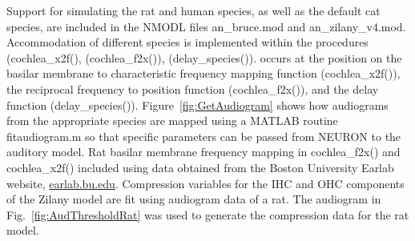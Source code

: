 Support for simulating the rat and human species, as well as the default cat
species, are included in the NMODL files \mbox{\textsf{an\_bruce.mod}} and
\mbox{\textsf{an\_zilany\_v4.mod}}.  Accommodation of different species is
implemented within the procedures (\mbox{\textsf{cochlea\_x2f()}},
(\mbox{\textsf{cochlea\_f2x()}}), (\mbox{\textsf{delay\_species()}}). occurs at
the position on the basilar membrane to characteristic frequency mapping
function (\mbox{\textsf{cochlea\_x2f()}}), the reciprocal frequency to position
function (\mbox{\textsf{cochlea\_f2x()}}), and the delay function
(\mbox{\textsf{delay\_species()}}).  Figure~\ref{fig:GetAudiogram} shows how
audiograms from the appropriate species are mapped using a MATLAB routine
\mbox{\textsf{fitaudiogram.m}} so that specific parameters can be passed from
NEURON to the auditory model.  Rat basilar membrane frequency mapping in
\mbox{\textsf{cochlea\_f2x()}} and \mbox{\textsf{cochlea\_x2f()}} included using
data obtained from the Boston University Earlab website, \url{earlab.bu.edu}.
Compression variables for the IHC and OHC components of the Zilany model are fit
using audiogram data of a rat.  The audiogram in Fig.~\ref{fig:AudThresholdRat}
was used to generate the compression data for the rat model.






